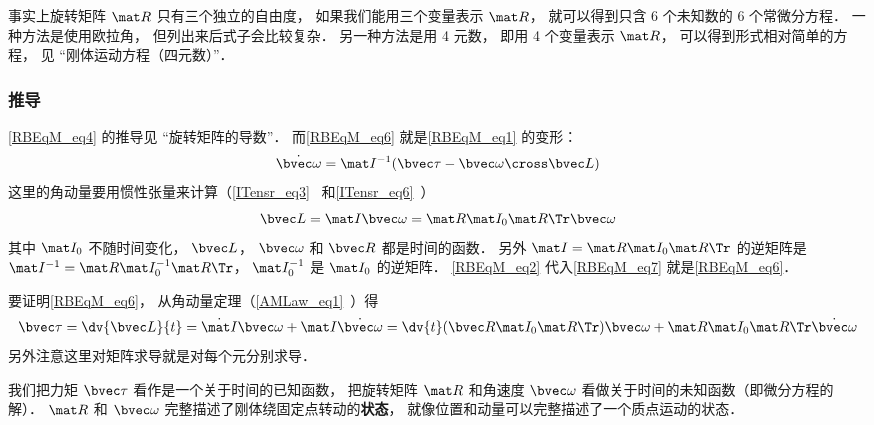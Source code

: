 事实上旋转矩阵 $\mat R$ 只有三个独立的自由度， 如果我们能用三个变量表示 $\mat R$， 就可以得到只含 6 个未知数的 6 个常微分方程． 一种方法是使用欧拉角， 但列出来后式子会比较复杂． 另一种方法是用 4 元数， 即用 4 个变量表示 $\mat R$， 可以得到形式相对简单的方程， 见 “刚体运动方程（四元数）”．


\subsubsection{推导}
\autoref{RBEqM_eq4} 的推导见 “旋转矩阵的导数”． 而\autoref{RBEqM_eq6} 就是\autoref{RBEqM_eq1} 的变形：
\begin{equation}\label{RBEqM_eq7}
\dot{\bvec \omega} = \mat I^{-1} (\bvec\tau - \bvec\omega\cross\bvec L)
\end{equation}
这里的角动量要用惯性张量来计算（\autoref{ITensr_eq3}~ 和\autoref{ITensr_eq6}~）
\begin{equation}\label{RBEqM_eq2}
\bvec L = \mat I \bvec \omega = \mat R \mat I_0 \mat R\Tr \bvec \omega
\end{equation}
其中 $\mat I_0$ 不随时间变化， $\bvec L$， $\bvec \omega$ 和 $\bvec R$ 都是时间的函数． 另外 $\mat I = \mat R \mat I_0 \mat R\Tr$ 的逆矩阵是 $\mat I^{-1} = \mat R \mat I_0^{-1} \mat R\Tr$， $\mat I_0^{-1}$ 是 $\mat I_0$ 的逆矩阵． \autoref{RBEqM_eq2} 代入\autoref{RBEqM_eq7} 就是\autoref{RBEqM_eq6}．

要证明\autoref{RBEqM_eq6}， 从角动量定理（\autoref{AMLaw_eq1}~）得
\begin{equation}\label{RBEqM_eq3}
\bvec \tau = \dv{\bvec L}{t} = \dot{\mat I} \bvec\omega + \mat I \dot{\bvec\omega}
= \dv{t} (\bvec R\mat I_0 \mat R\Tr) \bvec \omega + \mat R \mat I_0 \mat R\Tr \dot{\bvec \omega}
\end{equation}
另外注意这里对矩阵求导就是对每个元分别求导．

我们把力矩 $\bvec \tau$ 看作是一个关于时间的已知函数， 把旋转矩阵 $\mat R$ 和角速度 $\bvec \omega$ 看做关于时间的未知函数（即微分方程的解）． $\mat R$ 和 $\bvec \omega$ 完整描述了刚体绕固定点转动的\textbf{状态}， 就像位置和动量可以完整描述了一个质点运动的状态．


